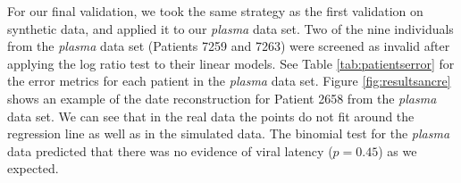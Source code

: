 \documentclass{bmcart}
\begin{document}
For our final validation, we took the same strategy as the first validation on synthetic data, and applied it to our {\em plasma} data set.%
Two of the nine individuals from the {\em plasma} data set (Patients 7259 and 7263) were screened as invalid after applying the log ratio test to their linear models.
See Table \ref{tab:patientserror} for the error metrics for each patient in the \emph{plasma} data set.
Figure \ref{fig:resultsancre} shows an example of the date reconstruction for Patient 2658 from the \emph{plasma} data set.
We can see that in the real data the points do not fit around the regression line as well as in the simulated data.
The binomial test for the \emph{plasma} data predicted that there was no evidence of viral latency ($p=0.45$) as we expected.
\end{document}
